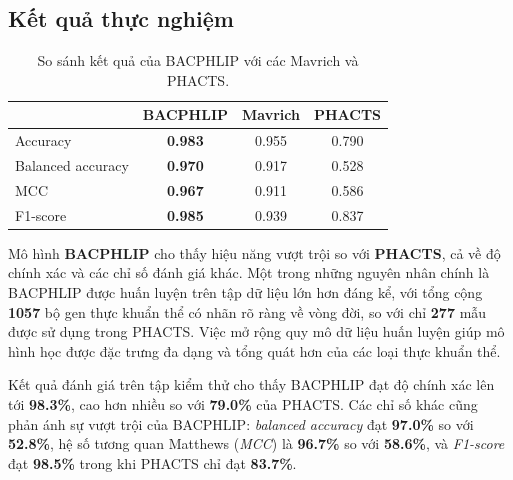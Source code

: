 \subsection*{Kết quả thực nghiệm}

\begin{table}[h]
\centering
\caption{So sánh kết quả của BACPHLIP với các Mavrich và PHACTS.}
\label{tab:BACPHLIP_result}
\begin{tabular}{lccc}
\hline
& \textbf{BACPHLIP} & \textbf{Mavrich} & \textbf{PHACTS} \\
\hline
Accuracy          & \textbf{0.983} & 0.955 & 0.790  \\
Balanced accuracy & \textbf{0.970} & 0.917 & 0.528 \\
MCC               & \textbf{0.967} & 0.911 & 0.586 \\
F1-score          & \textbf{0.985} & 0.939 & 0.837 \\
\hline
\end{tabular}
\end{table}

Mô hình \textbf{BACPHLIP} cho thấy hiệu năng vượt trội so với \textbf{PHACTS}, cả về độ chính xác và các chỉ số đánh giá khác. Một trong những nguyên nhân chính là BACPHLIP được huấn luyện trên tập dữ liệu lớn hơn đáng kể, với tổng cộng \textbf{1057} bộ gen thực khuẩn thể có nhãn rõ ràng về vòng đời, so với chỉ \textbf{277} mẫu được sử dụng trong PHACTS. Việc mở rộng quy mô dữ liệu huấn luyện giúp mô hình học được đặc trưng đa dạng và tổng quát hơn của các loại thực khuẩn thể.

Kết quả đánh giá trên tập kiểm thử cho thấy BACPHLIP đạt độ chính xác lên tới \textbf{98.3\%}, cao hơn nhiều so với \textbf{79.0\%} của PHACTS. Các chỉ số khác cũng phản ánh sự vượt trội của BACPHLIP: \textit{balanced accuracy} đạt \textbf{97.0\%} so với \textbf{52.8\%}, hệ số tương quan Matthews (\textit{MCC}) là \textbf{96.7\%} so với \textbf{58.6\%}, và \textit{F1-score} đạt \textbf{98.5\%} trong khi PHACTS chỉ đạt \textbf{83.7\%}. 
